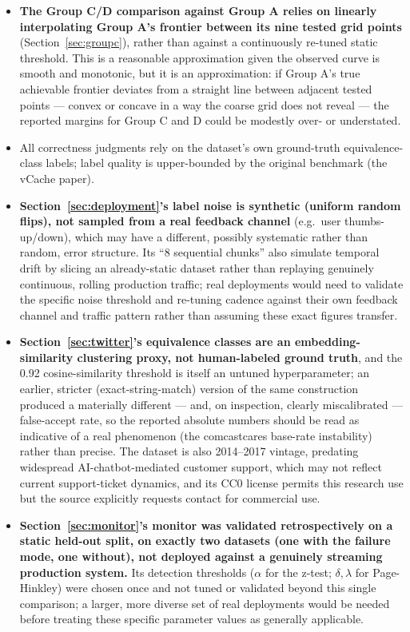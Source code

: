 \documentclass[11pt]{article}
\begin{document}
\begin{itemize}[leftmargin=*]
  \item \textbf{The Group C/D comparison against Group A relies on linearly interpolating Group A's frontier between its nine tested grid points} (Section~\ref{sec:groupc}), rather than against a continuously re-tuned static threshold. This is a reasonable approximation given the observed curve is smooth and monotonic, but it is an approximation: if Group A's true achievable frontier deviates from a straight line between adjacent tested points --- convex or concave in a way the coarse grid does not reveal --- the reported margins for Group C and D could be modestly over- or understated.
  \item All correctness judgments rely on the dataset's own ground-truth equivalence-class labels; label quality is upper-bounded by the original benchmark (the vCache paper).
  \item \textbf{Section~\ref{sec:deployment}'s label noise is synthetic (uniform random flips), not sampled from a real feedback channel} (e.g.\ user thumbs-up/down), which may have a different, possibly systematic rather than random, error structure. Its ``8 sequential chunks'' also simulate temporal drift by slicing an already-static dataset rather than replaying genuinely continuous, rolling production traffic; real deployments would need to validate the specific noise threshold and re-tuning cadence against their own feedback channel and traffic pattern rather than assuming these exact figures transfer.
  \item \textbf{Section~\ref{sec:twitter}'s equivalence classes are an embedding-similarity clustering proxy, not human-labeled ground truth}, and the 0.92 cosine-similarity threshold is itself an untuned hyperparameter; an earlier, stricter (exact-string-match) version of the same construction produced a materially different --- and, on inspection, clearly miscalibrated --- false-accept rate, so the reported absolute numbers should be read as indicative of a real phenomenon (the comcastcares base-rate instability) rather than precise. The dataset is also 2014--2017 vintage, predating widespread AI-chatbot-mediated customer support, which may not reflect current support-ticket dynamics, and its CC0 license permits this research use but the source explicitly requests contact for commercial use.
  \item \textbf{Section~\ref{sec:monitor}'s monitor was validated retrospectively on a static held-out split, on exactly two datasets (one with the failure mode, one without), not deployed against a genuinely streaming production system.} Its detection thresholds ($\alpha$ for the z-test; $\delta,\lambda$ for Page-Hinkley) were chosen once and not tuned or validated beyond this single comparison; a larger, more diverse set of real deployments would be needed before treating these specific parameter values as generally applicable.

\end{itemize}
\end{document}
